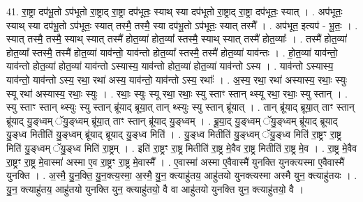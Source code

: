 \documentclass[17pt]{extarticle}
\begin{document}
41. रा॒ष्ट्रा दप॑भू॒तो ऽप॑भूतो रा॒ष्ट्राद् रा॒ष्ट्रा दप॑भूतः॒ स्याथ् स्या दप॑भूतो रा॒ष्ट्राद् रा॒ष्ट्रा दप॑भूतः॒ स्यात् । . अप॑भूतः॒ स्याथ् स्या दप॑भू॒तो ऽप॑भूतः॒ स्यात् तस्मै॒ तस्मै॒ स्या दप॑भू॒तो ऽप॑भूतः॒ स्यात् तस्मै᳚ । . अप॑भूत॒ इत्यप॑ - भू॒तः॒ । . स्यात् तस्मै॒ तस्मै॒ स्याथ् स्यात् तस्मै॑ होत॒व्या॑ होत॒व्या᳚ स्तस्मै॒ स्याथ् स्यात् तस्मै॑ होत॒व्याः᳚ । . तस्मै॑ होत॒व्या॑ होत॒व्या᳚ स्तस्मै॒ तस्मै॑ होत॒व्या॑ याव॑न्तो॒ याव॑न्तो होत॒व्या᳚ स्तस्मै॒ तस्मै॑ होत॒व्या॑ याव॑न्तः । . हो॒त॒व्या॑ याव॑न्तो॒ याव॑न्तो होत॒व्या॑ होत॒व्या॑ याव॑न्तो ऽस्यास्य॒ याव॑न्तो होत॒व्या॑ होत॒व्या॑ याव॑न्तो ऽस्य । . याव॑न्तो ऽस्यास्य॒ याव॑न्तो॒ याव॑न्तो ऽस्य॒ रथा॒ रथा॑ अस्य॒ याव॑न्तो॒ याव॑न्तो ऽस्य॒ रथाः᳚ । . अ॒स्य॒ रथा॒ रथा॑ अस्यास्य॒ रथाः॒ स्युः स्यू रथा॑ अस्यास्य॒ रथाः॒ स्युः । . रथाः॒ स्युः स्यू रथा॒ रथाः॒ स्यु स्ताꣳ स्तान् थ्स्यू रथा॒ रथाः॒ स्यु स्तान् । . स्यु स्ताꣳ स्तान् थ्स्युः स्यु स्तान् ब्रू॑याद् ब्रूया॒त् तान् थ्स्युः स्यु स्तान् ब्रू॑यात् । . तान् ब्रू॑याद् ब्रूया॒त् ताꣳ स्तान् ब्रू॑याद् यु॒ङ्ध्वम् ॅयु॒ङ्ध्वम् ब्रू॑या॒त् ताꣳ स्तान् ब्रू॑याद् यु॒ङ्ध्वम् । . ब्रू॒या॒द् यु॒ङ्ध्वम् ॅयु॒ङ्ध्वम् ब्रू॑याद् ब्रूयाद् यु॒ङ्ध्व मितीति॑ यु॒ङ्ध्वम् ब्रू॑याद् ब्रूयाद् यु॒ङ्ध्व मिति॑ । . यु॒ङ्ध्व मितीति॑ यु॒ङ्ध्वम् ॅयु॒ङ्ध्व मिति॑ रा॒ष्ट्रꣳ रा॒ष्ट्र मिति॑ यु॒ङ्ध्वम् ॅयु॒ङ्ध्व मिति॑ रा॒ष्ट्रम् । . इति॑ रा॒ष्ट्रꣳ रा॒ष्ट्र मितीति॑ रा॒ष्ट्र मे॒वैव रा॒ष्ट्र मितीति॑ रा॒ष्ट्र मे॒व । . रा॒ष्ट्र मे॒वैव रा॒ष्ट्रꣳ रा॒ष्ट्र मे॒वास्मा॑ अस्मा ए॒व रा॒ष्ट्रꣳ रा॒ष्ट्र मे॒वास्मै᳚ । . ए॒वास्मा॑ अस्मा ए॒वैवास्मै॑ युनक्ति युनक्त्यस्मा ए॒वैवास्मै॑ युनक्ति । . अ॒स्मै॒ यु॒न॒क्ति॒ यु॒न॒क्त्य॒स्मा॒ अ॒स्मै॒ यु॒न॒ क्त्याहु॑तय॒ आहु॑तयो युनक्त्यस्मा अस्मै युन॒ क्त्याहु॑तयः । . यु॒न॒ क्त्याहु॑तय॒ आहु॑तयो युनक्ति युन॒ क्त्याहु॑तयो॒ वै वा आहु॑तयो युनक्ति युन॒ क्त्याहु॑तयो॒ वै । \newline
\pagebreak
{}
\end{document}
